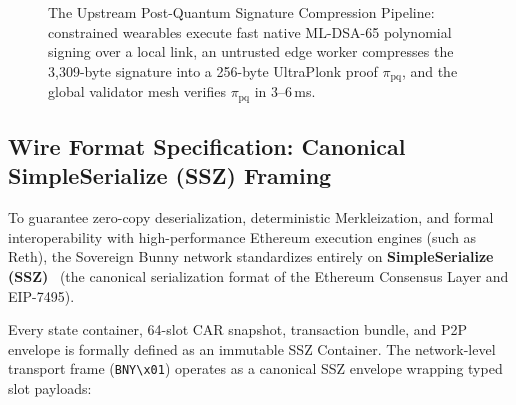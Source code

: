 \documentclass[a4paper,11pt,twoside,parskip=half-,headings=small]{scrartcl}
\newcommand{\code}[1]{\texttt{#1}}
\begin{document}
\begin{figure}[H]
{%
}
\caption{The Upstream Post-Quantum Signature Compression Pipeline: constrained wearables execute fast native ML-DSA-65 polynomial signing over a local link, an untrusted edge worker compresses the 3,309-byte signature into a 256-byte UltraPlonk proof $\pi_{\text{pq}}$, and the global validator mesh verifies $\pi_{\text{pq}}$ in $3$--$6$\,ms.}
\label{fig:pq_compression_pipeline}
\end{figure}

\subsection{Wire Format Specification: Canonical SimpleSerialize (SSZ) Framing}
\label{sec:wire_format}

To guarantee zero-copy deserialization, deterministic Merkleization, and formal interoperability with high-performance Ethereum execution engines (such as Reth), the Sovereign Bunny network standardizes entirely on \textbf{SimpleSerialize (SSZ)}~\cite{ssz2024} (the canonical serialization format of the Ethereum Consensus Layer and EIP-7495).

Every state container, 64-slot CAR snapshot, transaction bundle, and P2P envelope is formally defined as an immutable SSZ Container. The network-level transport frame (\code{BNY\textbackslash x01}) operates as a canonical SSZ envelope wrapping typed slot payloads:
\end{document}
